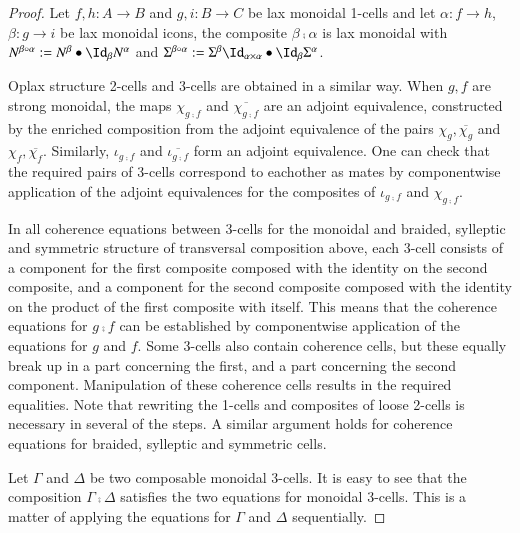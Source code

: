 \begin{proof}
Let $f,h: A \rightarrow B $ and $g,i: B \rightarrow C$ be lax monoidal 1-cells and let $\alpha: f \rightarrow h$, $\beta: g \rightarrow i$ be lax monoidal icons, the composite $\beta \comp \alpha$ is lax monoidal with $N^{\beta \comp \alpha}:= N^{\beta} \horc \looseid_{\beta} N^{\alpha}$ and $\Sigma^{\beta \comp \alpha}:= \Sigma^{\beta}\looseid_{\alpha \times \alpha} \horc \looseid_{\beta} \Sigma^{\alpha}$.

Oplax structure 2-cells and 3-cells are obtained in a similar way. When $g,f$ are strong monoidal, the maps $\chi_{g \comp f}$ and $\overline{\chi_{g \comp f}}$ are an adjoint equivalence, constructed by the enriched composition from the adjoint equivalence of the pairs $\chi_g, \overline{\chi_g}$ and $\chi_f, \overline{\chi_f}$. Similarly, $\iota_{g \comp f}$ and $\overline{\iota_{g \comp f}}$ form an adjoint equivalence. One can check that the required pairs of 3-cells correspond to eachother as mates by componentwise application of the adjoint equivalences for the composites of $\iota_{g \comp f}$ and $\chi_{g \comp f}$.

In all coherence equations between 3-cells for the monoidal and braided, sylleptic and symmetric structure of transversal composition above, each 3-cell consists of a component for the first composite  composed with the identity on the second composite, and a component for the second composite composed with the identity on the product of the first composite with itself. This means that the coherence equations for $g \comp f$  can be established by componentwise application of the equations for $g$ and $f$. Some 3-cells also contain coherence cells, but these equally break up in a part concerning the first, and a part concerning the second component. Manipulation of these coherence cells results in the required equalities. Note that rewriting the 1-cells and composites of loose 2-cells is necessary in several of the steps. A similar argument holds for coherence equations for braided, sylleptic and symmetric cells.

Let $\Gamma$ and $\Delta$ be two composable monoidal 3-cells. It is easy to see that the composition $\Gamma \comp \Delta$ satisfies the two equations for monoidal 3-cells. This is a matter of applying the equations for $\Gamma$ and $\Delta$ sequentially.
\end{proof}

